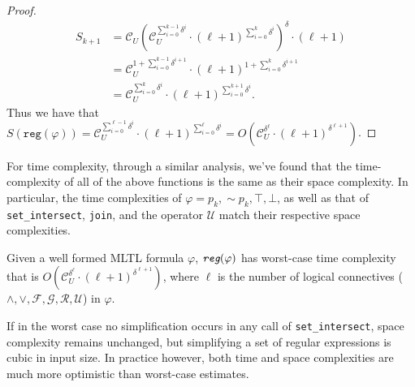 \documentclass[runningheads]{llncs}
\renewcommand{\phi}{\varphi}
\begin{document}
\begin{proof}
    \begin{align*}
        S_{k + 1} &= \mathcal{C}_U (\mathcal{C}_U^{\sum_{i = 0}^{k - 1} \delta^i} \cdot (\ell + 1)^{\sum_{i = 0}^{k} \delta^i}) ^ \delta \cdot (\ell + 1) \\
        &= \mathcal{C}_U^{1 + \sum_{i = 0}^{k - 1} \delta^{i + 1}} \cdot (\ell + 1)^{1 + \sum_{i = 0}^{k} \delta^{i + 1}} \\
        &= \mathcal{C}_U^{\sum_{i = 0}^k \delta^i} \cdot (\ell + 1)^{\sum_{i = 0}^{k+1} \delta^i}.
    \end{align*}
    Thus we have that $S(\texttt{reg}(\phi)) = \mathcal{C}_U^{\sum_{i = 0}^{\ell - 1} \delta^i} \cdot (\ell + 1)^{\sum_{i = 0}^{\ell} \delta^i} = O(\mathcal{C}_U^{\delta ^ \ell} \cdot (\ell + 1)^{\delta^{\ell + 1}})$.
 \end{proof}
 
For time complexity, through a similar analysis, we've found that the time-complexity of all of the above functions is the same as their space complexity. In particular, the time complexities of $\phi = p_k, \scriptstyle{\sim}\textstyle p_k, \top, \bot$, as well as that of \texttt{set\_intersect}, \texttt{join}, and the operator $\mathcal{U}$ match their respective space complexities.
\begin{theorem}
Given a well formed MLTL formula $\phi$, $\emph{\texttt{reg}}(\phi)$ has worst-case time complexity that is $O(\mathcal{C}_U^{\delta ^ \ell} \cdot (\ell + 1)^{\delta^{\ell + 1}})$, where $\ell$ is the number of logical connectives ($\land, \lor, \mathcal{F}, \mathcal{G}, \mathcal{R}, \mathcal{U}$) in $\phi$. 
\end{theorem}
If in the worst case no simplification occurs in any call of \texttt{set\_intersect}, space complexity remains unchanged, but simplifying a set of regular expressions is cubic in input size. In practice however, both time and space complexities are much more optimistic than worst-case estimates. 
 
\end{document}
